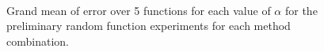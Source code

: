 \documentclass[a4paper,11pt]{article}
\begin{document}
    \begin{figure}[h!]
    \\
    \caption{Grand mean of error over 5 functions for each value of $\alpha$ for the preliminary random
    function experiments for each method combination.}
    \label{fig:randerror}
    \end{figure}
\end{document}
